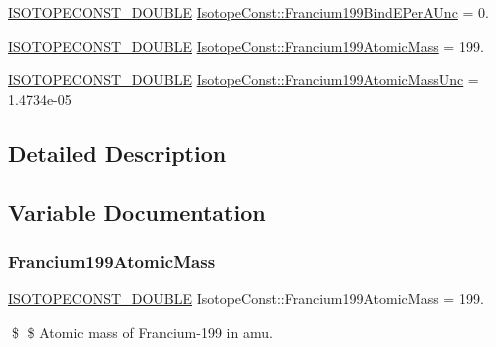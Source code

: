 \begin{DoxyCompactItemize}
\mbox{\hyperlink{group___isotope_const-_macros_ga8f45a7272ce02c0b4c65c44636ed719a}{I\+S\+O\+T\+O\+P\+E\+C\+O\+N\+S\+T\+\_\+\+D\+O\+U\+B\+LE}} \mbox{\hyperlink{group___isotope_const-_francium-_fr199_gaff70c24fe47d4f0ded4f9982700606ec}{Isotope\+Const\+::\+Francium199\+Bind\+E\+Per\+A\+Unc}} = 0.
\item 
\mbox{\hyperlink{group___isotope_const-_macros_ga8f45a7272ce02c0b4c65c44636ed719a}{I\+S\+O\+T\+O\+P\+E\+C\+O\+N\+S\+T\+\_\+\+D\+O\+U\+B\+LE}} \mbox{\hyperlink{group___isotope_const-_francium-_fr199_ga719d2568aa5d2a7f6a5e133741fca912}{Isotope\+Const\+::\+Francium199\+Atomic\+Mass}} = 199.
\item 
\mbox{\hyperlink{group___isotope_const-_macros_ga8f45a7272ce02c0b4c65c44636ed719a}{I\+S\+O\+T\+O\+P\+E\+C\+O\+N\+S\+T\+\_\+\+D\+O\+U\+B\+LE}} \mbox{\hyperlink{group___isotope_const-_francium-_fr199_ga3664ac0f642784a2fb31ba9b5032df5a}{Isotope\+Const\+::\+Francium199\+Atomic\+Mass\+Unc}} = 1.\+4734e-\/05
\end{DoxyCompactItemize}


\subsection{Detailed Description}


\subsection{Variable Documentation}
\mbox{\label{group___isotope_const-_francium-_fr199_ga719d2568aa5d2a7f6a5e133741fca912}} 
\subsubsection{\texorpdfstring{Francium199\+Atomic\+Mass}{Francium199AtomicMass}}
{\footnotesize\ttfamily \mbox{\hyperlink{group___isotope_const-_macros_ga8f45a7272ce02c0b4c65c44636ed719a}{I\+S\+O\+T\+O\+P\+E\+C\+O\+N\+S\+T\+\_\+\+D\+O\+U\+B\+LE}} Isotope\+Const\+::\+Francium199\+Atomic\+Mass = 199.}

\$ \$ Atomic mass of Francium-\/199 in amu. \mbox{\label{group___isotope_const-_francium-_fr199_ga3664ac0f642784a2fb31ba9b5032df5a}} 
